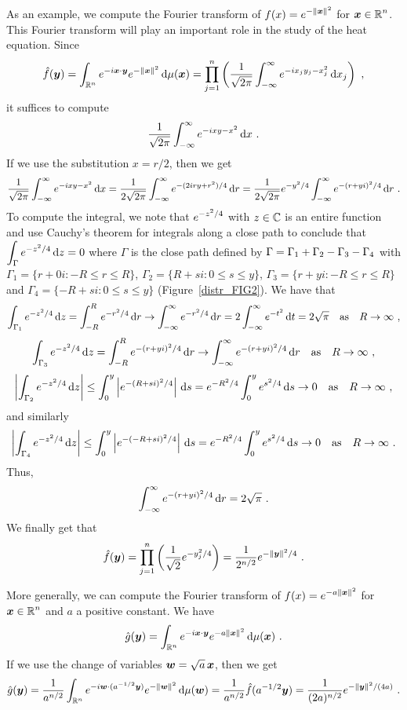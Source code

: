 \begin{egg}
As an example, we compute the Fourier transform of
$\displaystyle f(x) = e^{-\|{\bm{x}}\|^2}$ for $\displaystyle {\bm{x}} \in \mathbb{R}^n$.
This Fourier transform will play an important role in the study of the
heat equation.  \label{FTexpx2}
Since
\[
  \hat{f}(\VEC{y}) = \int_{\RR^n} e^{-i \VEC{x}\cdot\VEC{y}}
e^{-\|\VEC{x}\|^2} \dx{\mu(\VEC{x})} 
= \prod_{j=1}^n \left( \frac{1}{\sqrt{2\pi}}
  \int_{-\infty}^\infty  e^{-i x_j y_j - x_j^2} \dx{x_j} \right) \ ,
\]
it suffices to compute
\[
\frac{1}{\sqrt{2\pi}} \int_{-\infty}^\infty  e^{-i x y - x^2} \,\mathrm{d}{x} \ .
\]
If we use the substitution $x = r/2$, then we get
\[
\frac{1}{\sqrt{2\pi}} \int_{-\infty}^\infty  e^{-i x y - x^2} \,\mathrm{d}{x}
= \frac{1}{2\sqrt{2\pi}} \int_{-\infty}^\infty  e^{-(2 i r y + r^2)/4} \,\mathrm{d}{r}
= \frac{1}{2\sqrt{2\pi}} e^{-y^2/4}
\int_{-\infty}^\infty  e^{-(r+ y i)^2/4} \,\mathrm{d}{r} \ .
\]
To compute the integral, we note that $\displaystyle e^{-z^2/4}$ with
$z \in \mathbb{C}$ is an entire function and use Cauchy's theorem for
integrals along a close path to conclude that
$\displaystyle \int_{\Gamma} e^{-z^2/4} \,\mathrm{d}{z} = 0$ where $\Gamma$ is
the close path defined by
$\displaystyle \Gamma = \Gamma_1 + \Gamma_2 - \Gamma_3 - \Gamma_4$
with $\Gamma_1 = \{r + 0 i : -R \leq r \leq R\}$,
$\Gamma_2=\{R + s i : 0 \leq s \leq y \}$,
$\Gamma_3 = \{r + y i : -R \leq r \leq R\}$ and
$\Gamma_4 = \{-R + s i : 0 \leq s \leq y\}$ (Figure~\ref{distr_FIG2}).
We have that
\[
\int_{\Gamma_1} e^{-z^2/4} \,\mathrm{d}{z}
= \int_{-R}^R e^{-r^2/4} \,\mathrm{d}{r} \to \int_{-\infty}^\infty e^{-r^2/4} \,\mathrm{d}{r}
= 2 \int_{-\infty}^\infty e^{-t^2} \,\mathrm{d}{t} = 2\sqrt{\pi}
\quad \text{as} \quad R \to \infty \ ,
\]
\[
\int_{\Gamma_3} e^{-z^2/4} \,\mathrm{d}{z}
= \int_{-R}^R e^{-(r+y i)^2/4} \,\mathrm{d}{r} \to
\int_{-\infty}^\infty e^{-(r+yi)^2/4} \,\mathrm{d}{r}
\quad \text{as} \quad R \to \infty \ ,
\]
\[
\left| \int_{\Gamma_2} e^{-z^2/4} \,\mathrm{d}{z} \right|
\leq \int_0^y \left| e^{-(R+s i)^2/4}\right| \,\mathrm{d}{s}
= e^{-R^2/4} \int_0^y e^{s^2/4} \,\mathrm{d}{s} \to 0
\quad \text{as} \quad R \to \infty \ ,
\]
and similarly
\[
\left| \int_{\Gamma_4} e^{-z^2/4} \,\mathrm{d}{z} \right|
\leq \int_0^y \left| e^{-(-R+s i)^2/4}\right| \,\mathrm{d}{s}
= e^{-R^2/4} \int_0^y e^{s^2/4} \,\mathrm{d}{s} \to 0
\quad \text{as} \quad R \to \infty \ .
\]
Thus,
\[
\int_{-\infty}^\infty  e^{-(r+ y i)^2/4} \,\mathrm{d}{r} = 2 \sqrt{\pi} \ .
\]
We finally get that
\[
\hat{f}({\bm{y}}) = 
\prod_{j=1}^n \left( \frac{1}{\sqrt{2}} e^{-y_j^2/4} \right)
= \frac{1}{2^{n/2}} e^{-\|{\bm{y}}\|^2/4} \ .
\]

More generally, we can compute the Fourier transform of
$\displaystyle f(x) = e^{-a \|{\bm{x}}\|^2}$ for
$\displaystyle {\bm{x}} \in \mathbb{R}^n$
and $a$ a positive constant.  We have
\[
\hat{g}({\bm{y}}) = \int_{\mathbb{R}^n} e^{-i {\bm{x}}\cdot{\bm{y}}}
e^{-a\|{\bm{x}}\|^2} \,\mathrm{d}{\mu({\bm{x}})} \ .
\]
If we use the change of variables ${\bm{w}} = \sqrt{a}\, {\bm{x}}$, then
we get
\begin{equation} \label{FTexpx2eq1}
\hat{g}({\bm{y}}) = \frac{1}{a^{n/2}}
\int_{\mathbb{R}^n} e^{-i {\bm{w}}\cdot (a^{-1/2}{\bm{y}})}
e^{-\|{\bm{w}}\|^2} \,\mathrm{d}{\mu({\bm{w}})}
= \frac{1}{a^{n/2}} \hat{f}(a^{-1/2}{\bm{y}})
= \frac{1}{(2a)^{n/2}} e^{-\|{\bm{y}}\|^2/(4a)} \ .
\end{equation}
\end{egg}

